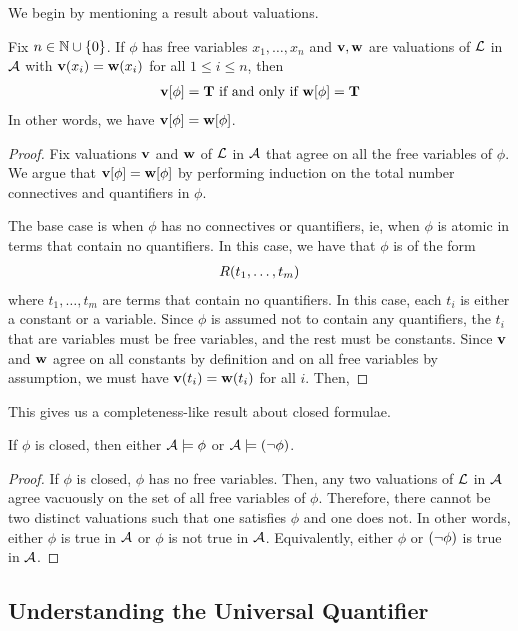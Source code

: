 We begin by mentioning a result about valuations.

\begin{boxtheorem}
    Fix $n \in \mathbb{N} \cup \left\{ 0 \right\}$. If $\phi$ has free variables $x_1, \ldots, x_n$ and $\mathbf{v}, \mathbf{w}$ are valuations of $\mathcal{L}$ in $\mathcal{A}$ with $\mathbf{v}\!\left( x_i \right) = \mathbf{w}\!\left( x_i \right)$ for all $1 \leq i \leq n$, then
    \begin{align*}
        \mathbf{v}\!\left[ \phi \right] = \mathbf{T} \text{ if and only if } \mathbf{w}\!\left[ \phi \right] = \mathbf{T}
    \end{align*}
    In other words, we have $\mathbf{v}\!\left[ \phi \right] = \mathbf{w}\!\left[ \phi \right]$.
\end{boxtheorem}
\begin{proof}
    Fix valuations $\mathbf{v}$ and $\mathbf{w}$ of $\mathcal{L}$ in $\mathcal{A}$ that agree on all the free variables of $\phi$. We argue that $\mathbf{v}\!\left[ \phi \right] = \mathbf{w}\!\left[ \phi \right]$ by performing induction on the total number connectives and quantifiers in $\phi$.

    The base case is when $\phi$ has no connectives or quantifiers, ie, when $\phi$ is atomic in terms that contain no quantifiers. In this case, we have that $\phi$ is of the form
    \begin{align*}
        R\!\left( t_1, \ldots, t_m \right)
    \end{align*}
    where $t_1, \ldots, t_m$ are terms that contain no quantifiers. In this case, each $t_i$ is either a constant or a variable. Since $\phi$ is assumed not to contain any quantifiers, the $t_i$ that are variables must be free variables, and the rest must be constants. Since $\mathbf{v}$ and $\mathbf{w}$ agree on all constants by definition and on all free variables by assumption, we must have
    $\mathbf{v}\!\left( t_i \right) = \mathbf{w}\!\left( t_i \right)$ for all $i$. Then, \sorry
\end{proof}

This gives us a completeness-like result about closed formulae.

\begin{boxcorollary}
    If $\phi$ is closed, then either $\mathcal{A} \models \phi$ or $\mathcal{A} \models \left( \neg \phi \right)$.
\end{boxcorollary}
\begin{proof}
    If $\phi$ is closed, $\phi$ has no free variables. Then, any two valuations of $\mathcal{L}$ in $\mathcal{A}$ agree vacuously on the set of all free variables of $\phi$. Therefore, there cannot be two distinct valuations such that one satisfies $\phi$ and one does not. In other words, either $\phi$ is true in $\mathcal{A}$ or $\phi$ is not true in $\mathcal{A}$. Equivalently, either $\phi$ or $\left( \neg \phi \right)$ is true in $\mathcal{A}$. 
\end{proof}


\subsection{Understanding the Universal Quantifier}

